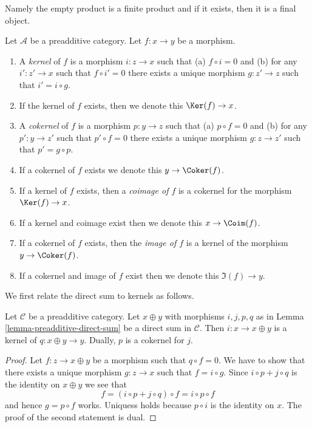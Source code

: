 \noindent
Namely the empty product is a finite product and
if it exists, then it is a final object.

\begin{definition}
\label{definition-kernel}
Let $\mathcal{A}$ be a preadditive category.
Let $f : x \to y$ be a morphism.
\begin{enumerate}
\item A {\it kernel} of $f$ is a morphism
$i : z \to x$ such that (a) $f \circ i = 0$ and (b)
for any $i' : z' \to x$ such that $f \circ i' = 0$ there
exists a unique morphism $g : z' \to z$ such that
$i' = i \circ g$.
\item If the kernel of $f$ exists, then we denote
this $\Ker(f) \to x$.
\item A {\it cokernel} of $f$ is a morphism
$p : y \to z$ such that (a) $p \circ f = 0$ and (b)
for any $p' : y \to z'$ such that $p' \circ f = 0$ there
exists a unique morphism $g : z \to z'$ such that
$p' = g \circ p$.
\item If a cokernel of $f$ exists we denote this
$y \to \Coker(f)$.
\item If a kernel of $f$ exists, then a {\it coimage
of $f$} is a cokernel for the morphism $\Ker(f) \to x$.
\item If a kernel and coimage exist then we denote this
$x \to \Coim(f)$.
\item If a cokernel of $f$ exists, then the {\it image of
$f$} is a kernel of the morphism $y \to \Coker(f)$.
\item If a cokernel and image of $f$ exist then we denote
this $\Im(f) \to y$.
\end{enumerate}
\end{definition}

\noindent
We first relate the direct sum to kernels as follows.

\begin{lemma}
\label{lemma-additive-cat-biproduct-kernel}
Let $\mathcal{C}$ be a preadditive category.
Let $x \oplus y$ with morphisms $i, j, p, q$ as in
Lemma \ref{lemma-preadditive-direct-sum}
be a direct sum in $\mathcal{C}$. Then $i : x \to x \oplus y$
is a kernel of $q : x \oplus y \rightarrow y$. Dually, $p$ is
a cokernel for $j$.
\end{lemma}

\begin{proof}
Let $f : z \to x \oplus y$ be a morphism such that $q \circ f = 0$.
We have to show that there exists a unique morphism $g : z \to x$
such that $f = i \circ g$. Since $i \circ p + j \circ q$ is the identity on
$x \oplus y$ we see that
$$
f = (i \circ p + j \circ q) \circ f = i \circ p \circ f
$$
and hence $g = p \circ f$ works. Uniquess holds because $p \circ i$
is the identity on $x$. The proof of the second statement is dual.
\end{proof}

